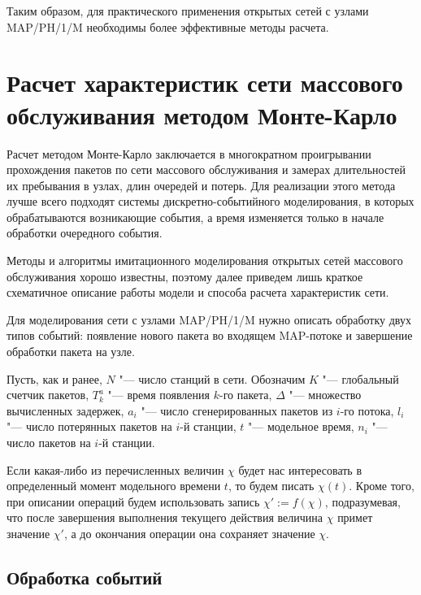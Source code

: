 Таким образом, для практического применения открытых сетей с узлами MAP/PH/1/M необходимы более эффективные методы расчета.




\section{Расчет характеристик сети массового обслуживания методом Монте-Карло}\label{sec:ch4_mc}

Расчет методом Монте-Карло заключается в многократном проигрывании прохождения пакетов по сети массового обслуживания и замерах длительностей их пребывания в узлах, длин очередей и потерь. Для реализации этого метода лучше всего подходят системы дискретно-событийного моделирования, в которых обрабатываются возникающие события, а время изменяется только в начале обработки очередного события.

Методы и алгоритмы имитационного моделирования открытых сетей массового обслуживания хорошо известны, поэтому далее приведем лишь краткое схематичное описание работы модели и способа расчета характеристик сети.

Для моделирования сети с узлами MAP/PH/1/M нужно описать обработку двух типов событий: появление нового пакета во входящем MAP-потоке и завершение обработки пакета на узле.

Пусть, как и ранее, $N$ "--- число станций в сети. Обозначим $K$ "--- глобальный счетчик пакетов, $T_k^a$ "--- время появления $k$-го пакета, $\Delta$ "--- множество вычисленных задержек, $a_i$ "--- число сгенерированных пакетов из $i$-го потока, $l_i$ "--- число потерянных пакетов на $i$-й станции, $t$ "--- модельное время, $n_i$ "--- число пакетов на $i$-й станции.

Если какая-либо из перечисленных величин $\chi$ будет нас интересовать в определенный момент модельного времени $t$, то будем писать $\chi(t)$. Кроме того, при описании операций будем использовать запись $\chi' := f(\chi)$, подразумевая, что после завершения выполнения текущего действия величина $\chi$ примет значение $\chi'$, а до окончания операции она сохраняет значение $\chi$.


\subsection{Обработка событий}


